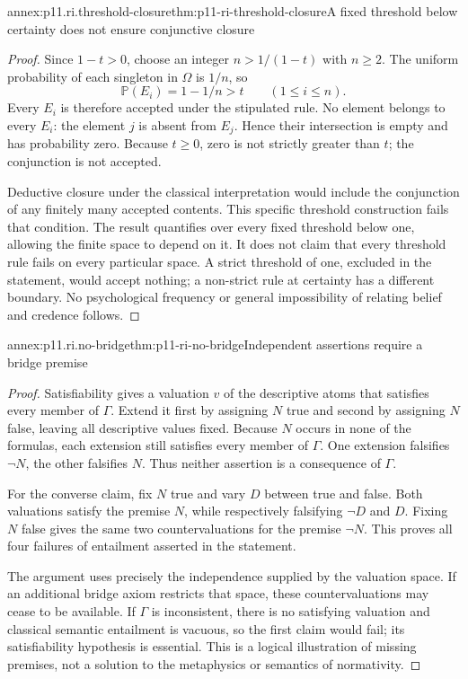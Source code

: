 \begin{annexitem}{annex:p11.ri.threshold-closure}{thm:p11-ri-threshold-closure}{A fixed threshold below certainty does not ensure conjunctive closure}
\begin{proof}
Since \(1-t>0\), choose an integer
\(n>1/(1-t)\) with \(n\geq2\). The uniform probability
of each singleton in \(\Omega\) is \(1/n\), so
\[
 \mathbb P(E_i)=1-1/n>t\qquad(1\leq i\leq n).
\]
Every \(E_i\) is therefore accepted under the stipulated rule.
No element belongs to every \(E_i\): the element \(j\) is
absent from \(E_j\). Hence their intersection is empty and has
probability zero. Because \(t\geq0\), zero is not strictly
greater than \(t\); the conjunction is not accepted.

Deductive closure under the classical interpretation would include
the conjunction of any finitely many accepted contents. This
specific threshold construction fails that condition. The result
quantifies over every fixed threshold below one, allowing the
finite space to depend on it. It does not claim that every threshold
rule fails on every particular space. A strict threshold of one,
excluded in the statement, would accept nothing; a non-strict rule
at certainty has a different boundary. No psychological frequency
or general impossibility of relating belief and credence follows.
\end{proof}
\end{annexitem}

\begin{annexitem}{annex:p11.ri.no-bridge}{thm:p11-ri-no-bridge}{Independent assertions require a bridge premise}
\begin{proof}
Satisfiability gives a valuation \(v\) of the descriptive atoms
that satisfies every member of \(\Gamma\). Extend it first by
assigning \(N\) true and second by assigning \(N\) false,
leaving all descriptive values fixed. Because \(N\) occurs in
none of the formulas, each extension still satisfies every member
of \(\Gamma\). One extension falsifies \(\neg N\), the other
falsifies \(N\). Thus neither assertion is a consequence of
\(\Gamma\).

For the converse claim, fix \(N\) true and vary \(D\) between
true and false. Both valuations satisfy the premise \(N\),
while respectively falsifying \(\neg D\) and \(D\).
Fixing \(N\) false gives the same two countervaluations for
the premise \(\neg N\). This proves all four failures of
entailment asserted in the statement.

The argument uses precisely the independence supplied by the
valuation space. If an additional bridge axiom restricts that
space, these countervaluations may cease to be available. If
\(\Gamma\) is inconsistent, there is no satisfying valuation
and classical semantic entailment is vacuous, so the first claim
would fail; its satisfiability hypothesis is essential. This is a
logical illustration of missing premises, not a solution to the
metaphysics or semantics of normativity.
\end{proof}
\end{annexitem}

